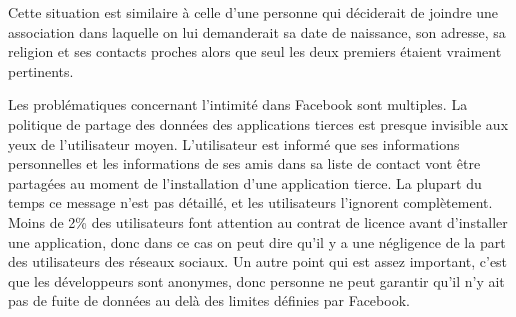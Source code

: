 Cette situation est similaire à celle d'une personne qui déciderait de joindre
une association dans laquelle on lui demanderait sa date de naissance, son
adresse, sa religion et ses contacts proches alors que seul les deux premiers
étaient vraiment pertinents.

Les problématiques concernant l'intimité dans Facebook sont multiples.
\cite{facebook-user-privacy} La politique de partage des données des
applications tierces est presque invisible aux yeux de l’utilisateur moyen.
L’utilisateur est informé que ses informations personnelles et les informations
de ses amis dans sa liste de contact vont être partagées au moment de
l'installation d'une application tierce. La plupart du temps ce message n’est
pas détaillé, et les utilisateurs l’ignorent complètement.  Moins de 2\% des
utilisateurs font attention au contrat de licence avant d’installer une
application, donc dans ce cas on peut dire qu’il y a une négligence de la part
des utilisateurs des réseaux sociaux. Un autre point qui est assez important,
c’est que les développeurs sont anonymes, donc personne ne peut garantir qu’il
n’y ait pas de fuite de données au delà des limites définies par Facebook.


